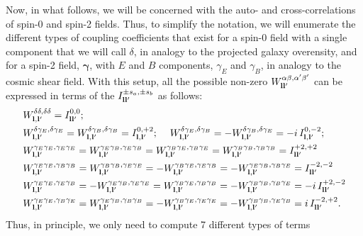 \documentclass[a4paper,11pt]{article}
\begin{document}
      Now, in what follows, we will be concerned with the auto- and
      cross-correlations of spin-0 and spin-2 fields. Thus, to simplify the
      notation, we will enumerate the different types of coupling coefficients
      that exist for a spin-0 field with a single component that we will call
      $\delta$, in analogy to the projected galaxy overensity, and for a
      spin-2 field, $\boldsymbol{\gamma}$, with $E$ and $B$ components, $\gamma_E$ and $\gamma_B$, in analogy to the cosmic shear field. With this setup, all the possible non-zero $W^{\alpha\beta,\alpha'\beta'}_{{\bf l}{\bf l}'}$ can be expressed in terms of the $I^{\pm s_a,\pm s_b}_{{\bf l}{\bf l}'}$ as follows:
      \begin{align}\label{eq:coeff}
        &W^{\delta\delta,\delta\delta}_{{\bf l},{\bf l}'}=I^{0,0}_{{\bf l}{\bf l}'}; \\
        &W^{\delta\gamma_E,\delta\gamma_E}_{{\bf l},{\bf l}'}=W^{\delta\gamma_B,\delta\gamma_B}_{{\bf l},{\bf l}'}=I^{0,+2}_{{\bf l},{\bf l}'};\hspace{12pt}
        W^{\delta\gamma_E,\delta\gamma_B}_{{\bf l},{\bf l}'}=-W^{\delta\gamma_B,\delta\gamma_E}_{{\bf l},{\bf l}'}=-i\,I^{0,-2}_{{\bf l},{\bf l}'};\\
        &W^{\gamma_E\gamma_E,\gamma_E\gamma_E}_{{\bf l},{\bf l}'}=W^{\gamma_E\gamma_B,\gamma_E\gamma_B}_{{\bf l},{\bf l}'}=W^{\gamma_B\gamma_E,\gamma_B\gamma_E}_{{\bf l},{\bf l}'}=W^{\gamma_B\gamma_B,\gamma_B\gamma_B}_{{\bf l},{\bf l}'}=I^{+2,+2}_{{\bf l}{\bf l}'}\\
        &W^{\gamma_E\gamma_E,\gamma_B\gamma_B}_{{\bf l},{\bf l}'}=W^{\gamma_B\gamma_B,\gamma_E\gamma_E}_{{\bf l},{\bf l}'}=-W^{\gamma_B\gamma_E,\gamma_E\gamma_B}_{{\bf l},{\bf l}'}=-W^{\gamma_E\gamma_B,\gamma_B\gamma_E}_{{\bf l},{\bf l}'}=I^{-2,-2}_{{\bf l}{\bf l}'}\\
        &W^{\gamma_E\gamma_E,\gamma_E\gamma_B}_{{\bf l},{\bf l}'}=-W^{\gamma_E\gamma_B,\gamma_E\gamma_E}_{{\bf l},{\bf l}'}=W^{\gamma_B\gamma_E,\gamma_B\gamma_B}_{{\bf l},{\bf l}'}=-W^{\gamma_B\gamma_B,\gamma_B\gamma_E}_{{\bf l},{\bf l}'}=-i\,I^{+2,-2}_{{\bf l}{\bf l}'}\\
        &W^{\gamma_E\gamma_E,\gamma_B\gamma_E}_{{\bf l},{\bf l}'}=W^{\gamma_E\gamma_B,\gamma_B\gamma_B}_{{\bf l},{\bf l}'}=-W^{\gamma_B\gamma_E,\gamma_E\gamma_E}_{{\bf l},{\bf l}'}=-W^{\gamma_B\gamma_B,\gamma_E\gamma_B}_{{\bf l},{\bf l}'}=i\,I^{-2,+2}_{{\bf l}{\bf l}'}.
      \end{align}
      Thus, in principle, we only need to compute 7 different types of terms
\end{document}
